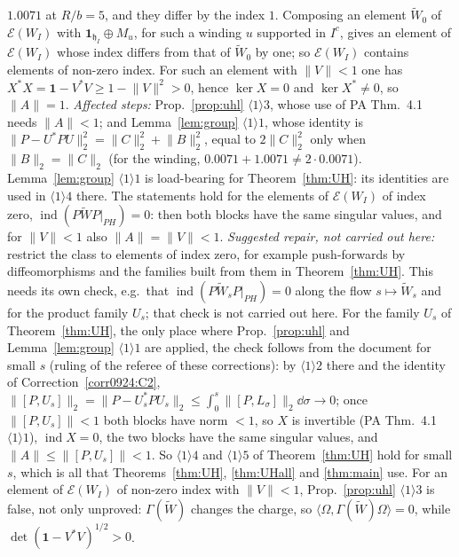 \documentclass[11pt]{article}
\newcommand{\Wt}{\widetilde W}\newcommand{\kt}{\widetilde k}\newcommand{\Om}{\Omega}\newcommand{\Gm}{\Gamma}
\newcommand{\norm}[1]{\lVert #1\rVert}\newcommand{\abs}[1]{\lvert #1\rvert}
\newcommand{\ip}[2]{\langle #1,#2\rangle}\newcommand{\one}{\mathbf 1}
\begin{document}
\begin{enumerate}[label=\textbf{C\arabic*},ref=C\arabic*,leftmargin=2.6em,itemsep=2pt]
 $1.0071$ at $R/b=5$, and they differ by the index $1$.  Composing an element $\Wt_0$ of
 $\mathcal E(W_I)$ with $\one_{\mathfrak h_I}\oplus M_u$, for such a winding $u$ supported in
 $I^c$, gives an element of $\mathcal E(W_I)$ whose index differs from that of $\Wt_0$ by one; so
 $\mathcal E(W_I)$ contains elements of non-zero index.  For such an element with $\norm V<1$ one
 has $X^*X=\one-V^*V\ge1-\norm V^2>0$, hence $\ker X=0$ and $\ker X^*\ne0$, so $\norm A=1$.
 \emph{Affected steps:} Prop.~\ref{prop:uhl} $\langle1\rangle3$, whose use of PA Thm.~4.1 needs
 $\norm A<1$; and Lemma~\ref{lem:group} $\langle1\rangle1$, whose identity is
 $\norm{P-U^*PU}_2^2=\norm C_2^2+\norm B_2^2$, equal to $2\norm C_2^2$ only when $\norm B_2=\norm C_2$
 (for the winding, $0.0071+1.0071\ne2\cdot0.0071$).  Lemma~\ref{lem:group} $\langle1\rangle1$ is
 load-bearing for Theorem~\ref{thm:UH}: its identities are used in $\langle1\rangle4$ there.  The
 statements hold for the elements of $\mathcal E(W_I)$ of index zero,
 $\operatorname{ind}(P\Wt P|_{PH})=0$: then both blocks have the same singular values, and for
 $\norm V<1$ also $\norm A=\norm V<1$.
 \emph{Suggested repair, not carried out here:} restrict the class to elements of index zero, for
 example push-forwards by diffeomorphisms and the families built from them in
 Theorem~\ref{thm:UH}.  This needs its own check, e.g.\ that $\operatorname{ind}(P\Wt_sP|_{PH})=0$
 along the flow $s\mapsto\Wt_s$ and for the product family $U_s$; that check is not carried out
 here.  For the family $U_s$ of Theorem~\ref{thm:UH}, the only place where Prop.~\ref{prop:uhl}
 and Lemma~\ref{lem:group} $\langle1\rangle1$ are applied, the check follows from the document for
 small $s$ (ruling of the referee of these corrections): by $\langle1\rangle2$ there and the identity
 of Correction~\ref{corr0924:C2},
 $\norm{[P,U_s]}_2=\norm{P-U_s^*PU_s}_2\le\int_0^s\norm{[P,L_\sigma]}_2\dd\sigma\to0$; once
 $\norm{[P,U_s]}<1$ both blocks have norm $<1$, so $X$ is invertible (PA Thm.~4.1
 $\langle1\rangle1$), $\operatorname{ind}X=0$, the two blocks have the same singular values, and
 $\norm A\le\norm{[P,U_s]}<1$.  So $\langle1\rangle4$ and $\langle1\rangle5$ of
 Theorem~\ref{thm:UH} hold for small $s$, which is all that Theorems~\ref{thm:UH}, \ref{thm:UHall}
 and \ref{thm:main} use.  For an element of $\mathcal E(W_I)$ of non-zero index with $\norm V<1$,
 Prop.~\ref{prop:uhl} $\langle1\rangle3$ is false, not only unproved: $\Gm(\Wt)$ changes the charge,
 so $\ip\Om{\Gm(\Wt)\Om}=0$, while $\det(\one-V^*V)^{1/2}>0$.
\end{enumerate}
\end{document}
